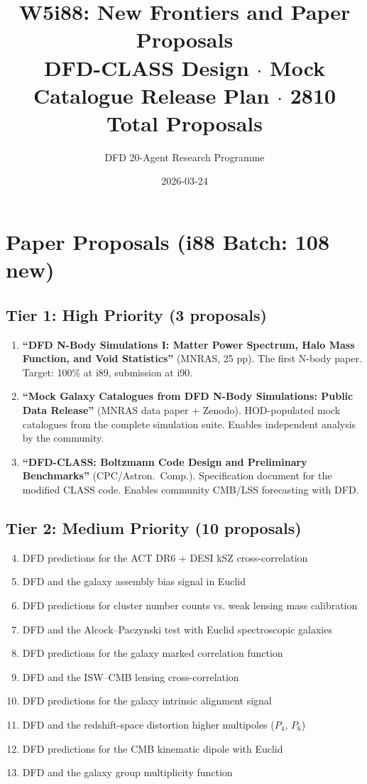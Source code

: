 \documentclass[11pt,a4paper]{article}
\title{W5i88: New Frontiers and Paper Proposals\\[6pt]
\large DFD-CLASS Design $\cdot$ Mock Catalogue Release Plan $\cdot$ 2810 Total Proposals}
\author{DFD 20-Agent Research Programme}
\date{2026-03-24}
\begin{document}
\maketitle

\section{Paper Proposals (i88 Batch: 108 new)}

\subsection{Tier 1: High Priority (3 proposals)}

\begin{enumerate}[nosep]
\item \textbf{``DFD N-Body Simulations I: Matter Power Spectrum, Halo Mass Function, and Void Statistics''} (MNRAS, 25 pp). The first N-body paper. Target: 100\% at i89, submission at i90.

\item \textbf{``Mock Galaxy Catalogues from DFD N-Body Simulations: Public Data Release''} (MNRAS data paper + Zenodo). HOD-populated mock catalogues from the complete simulation suite. Enables independent analysis by the community.

\item \textbf{``DFD-CLASS: Boltzmann Code Design and Preliminary Benchmarks''} (CPC/Astron.\ Comp.). Specification document for the modified CLASS code. Enables community CMB/LSS forecasting with DFD.
\end{enumerate}

\subsection{Tier 2: Medium Priority (10 proposals)}

\begin{enumerate}[nosep]
\setcounter{enumi}{3}
\item DFD predictions for the ACT DR6 + DESI kSZ cross-correlation
\item DFD and the galaxy assembly bias signal in Euclid
\item DFD predictions for cluster number counts vs. weak lensing mass calibration
\item DFD and the Alcock--Paczynski test with Euclid spectroscopic galaxies
\item DFD predictions for the galaxy marked correlation function
\item DFD and the ISW--CMB lensing cross-correlation
\item DFD predictions for the galaxy intrinsic alignment signal
\item DFD and the redshift-space distortion higher multipoles ($P_4$, $P_6$)
\item DFD predictions for the CMB kinematic dipole with Euclid
\item DFD and the galaxy group multiplicity function
\end{enumerate}
\end{document}
